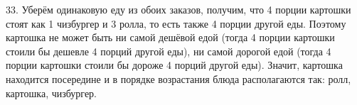 33. Уберём одинаковую еду из обоих заказов, получим, что 4 порции картошки стоят как 1 чизбургер и 3 ролла, то есть также 4 порции другой еды. Поэтому картошка не может быть ни самой дешёвой едой (тогда 4 порции картошки стоили бы дешевле 4 порций другой еды), ни самой дорогой едой (тогда 4 порции картошки стоили бы дороже 4 порций другой еды). Значит, картошка находится посередине и в порядке возрастания блюда располагаются так: ролл, картошка, чизбургер.\\
